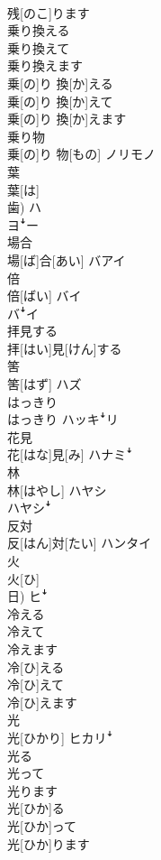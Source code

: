 \documentclass[8pt]{extreport}
\begin{document}
\begin{CJK}{UTF8}{min}
\\	残[のこ]ります	
\\	乗り換える 
\\	乗り換えて 
\\	乗り換えます	
\\	乗[の]り 換[か]える 
\\	乗[の]り 換[か]えて 
\\	乗[の]り 換[か]えます	
\\	乗り物	
\\	乗[の]り 物[もの]	ノリモノ
\\	葉	
\\	葉[は] 
\\	歯)	ハ 
\\	ヨꜜー
\\	場合	
\\	場[ば]合[あい]	バアイ
\\	倍	
\\	倍[ばい]	バイ 
\\	バꜜイ
\\	拝見する	
\\	拝[はい]見[けん]する	
\\	筈	
\\	筈[はず]	ハズ
\\	はっきり	
\\	はっきり	ハッキꜜリ
\\	花見	
\\	花[はな]見[み]	ハナミꜜ
\\	林	
\\	林[はやし]	ハヤシ 
\\	ハヤシꜜ
\\	反対	
\\	反[はん]対[たい]	ハンタイ
\\	火	
\\	火[ひ] 
\\	日)	ヒꜜ
\\	冷える 
\\	冷えて 
\\	冷えます	
\\	冷[ひ]える 
\\	冷[ひ]えて 
\\	冷[ひ]えます	
\\	光	
\\	光[ひかり]	ヒカリꜜ
\\	光る 
\\	光って 
\\	光ります	
\\	光[ひか]る 
\\	光[ひか]って 
\\	光[ひか]ります	

\end{CJK}
\end{document}
